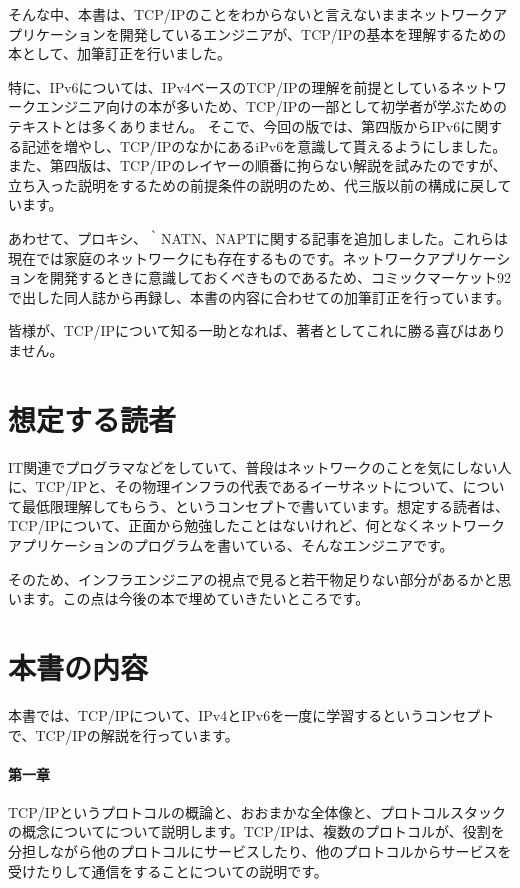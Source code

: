 そんな中、本書は、TCP/IPのことをわからないと言えないままネットワークアプリケーションを開発しているエンジニアが、TCP/IPの基本を理解するための本として、加筆訂正を行いました。

特に、IPv6については、IPv4ベースのTCP/IPの理解を前提としているネットワークエンジニア向けの本が多いため、TCP/IPの一部として初学者が学ぶためのテキストとは多くありません。
そこで、今回の版では、第四版からIPv6に関する記述を増やし、TCP/IPのなかにあるiPv6を意識して貰えるようにしました。
また、第四版は、TCP/IPのレイヤーの順番に拘らない解説を試みたのですが、立ち入った説明をするための前提条件の説明のため、代三版以前の構成に戻しています。

あわせて、プロキシ、｀NATN、NAPTに関する記事を追加しました。これらは現在では家庭のネットワークにも存在するものです。ネットワークアプリケーションを開発するときに意識しておくべきものであるため、コミックマーケット92で出した同人誌から再録し、本書の内容に合わせての加筆訂正を行っています。

皆様が、TCP/IPについて知る一助となれば、著者としてこれに勝る喜びはありません。

\section*{想定する読者}
IT関連でプログラマなどをしていて、普段はネットワークのことを気にしない人に、TCP/IPと、その物理インフラの代表であるイーサネットについて、について最低限理解してもらう、というコンセプトで書いています。想定する読者は、TCP/IPについて、正面から勉強したことはないけれど、何となくネットワークアプリケーションのプログラムを書いている、そんなエンジニアです。

そのため、インフラエンジニアの視点で見ると若干物足りない部分があるかと思います。この点は今後の本で埋めていきたいところです。


\section*{本書の内容}
本書では、TCP/IPについて、IPv4とIPv6を一度に学習するというコンセプトで、TCP/IPの解説を行っています。

\paragraph{第一章}
TCP/IPというプロトコルの概論と、おおまかな全体像と、プロトコルスタックの概念についてについて説明します。TCP/IPは、複数のプロトコルが、役割を分担しながら他のプロトコルにサービスしたり、他のプロトコルからサービスを受けたりして通信をすることについての説明です。

